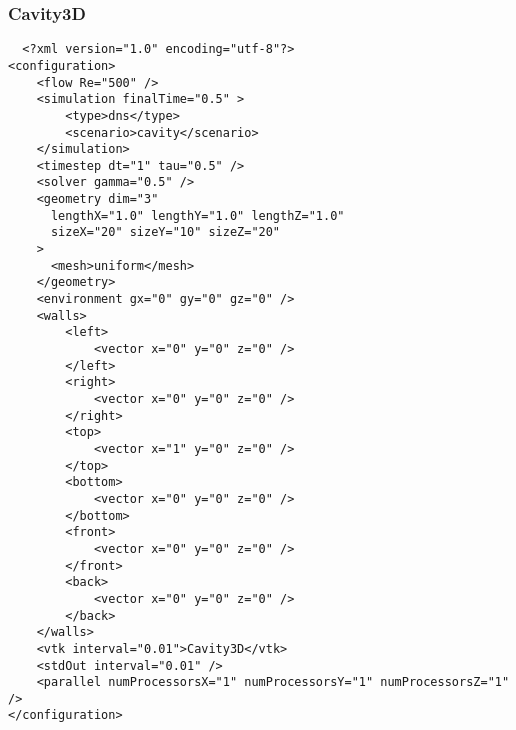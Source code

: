 \documentclass[
  english,        %
  font=palatino,     %
  onecolumn,      %
]{tumarticle}
\begin{document}
\subsubsection*{Cavity3D}

\begin{verbatim}
  <?xml version="1.0" encoding="utf-8"?>
<configuration>
    <flow Re="500" />
    <simulation finalTime="0.5" >
        <type>dns</type>
        <scenario>cavity</scenario>
    </simulation>
    <timestep dt="1" tau="0.5" />
    <solver gamma="0.5" />
    <geometry dim="3"
      lengthX="1.0" lengthY="1.0" lengthZ="1.0"
      sizeX="20" sizeY="10" sizeZ="20"
    >
      <mesh>uniform</mesh>
    </geometry>
    <environment gx="0" gy="0" gz="0" />
    <walls>
        <left>
            <vector x="0" y="0" z="0" />
        </left>
        <right>
            <vector x="0" y="0" z="0" />
        </right>
        <top>
            <vector x="1" y="0" z="0" />
        </top>
        <bottom>
            <vector x="0" y="0" z="0" />
        </bottom>
        <front>
            <vector x="0" y="0" z="0" />
        </front>
        <back>
            <vector x="0" y="0" z="0" />
        </back>
    </walls>
    <vtk interval="0.01">Cavity3D</vtk>
    <stdOut interval="0.01" />
    <parallel numProcessorsX="1" numProcessorsY="1" numProcessorsZ="1" />
</configuration>

\end{verbatim}
\end{document}
